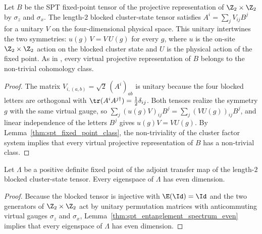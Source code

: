 \begin{lemma}
    \label{thm:cluster_spt_fixed_point}
    \leanok
    Let $B$ be the SPT fixed-point tensor of the projective representation of
    $\Z_2\times\Z_2$ by $\sigma_z$ and $\sigma_x$.  The length-$2$ blocked
    cluster-state tensor satisfies $A^i=\sum_jV_{ij}B^j$ for a unitary $V$ on the
    four-dimensional physical space.  This unitary intertwines the two symmetries:
    $u(g)\,V=V\,U(g)$ for every $g$, where $u$ is the on-site
    $\Z_2\times\Z_2$ action on the blocked cluster state and $U$ is the physical
    action of the fixed point. As in \cite[Section~III.A]{Cirac2021Matrix},
    every virtual projective representation of $B$ belongs to the non-trivial
    cohomology class.
\end{lemma}
\begin{proof}
    \leanok
    The matrix $V_{i,(a,b)}=\sqrt2\,(A^i)_{ab}$ is unitary because the four
    blocked letters are orthogonal with $\tr(A^iA^{j\dagger})=\tfrac12\delta_{ij}$.
    Both tensors realize the symmetry $g$ with the same virtual gauge, so
    $\sum_j(u(g)V)_{ij}B^j=\sum_j(VU(g))_{ij}B^j$, and linear independence of
    the letters $B^j$ gives $u(g)V=VU(g)$. By
    Lemma~\ref{thm:spt_fixed_point_class}, the non-triviality of the cluster
    factor system implies that every virtual projective representation of $B$
    has a non-trivial class.
\end{proof}

\begin{lemma}
    \label{thm:cluster_entanglement_spectrum_even}
    \leanok
    Let $\Lambda$ be a positive definite fixed point of the adjoint transfer map
    of the length-$2$ blocked cluster-state tensor.  Every eigenspace of
    $\Lambda$ has even dimension.
\end{lemma}
\begin{proof}
    \leanok
    Because the blocked tensor is injective with $\E(\Id)=\Id$ and the two
    generators of $\Z_2\times\Z_2$ act by unitary permutation matrices with
    anticommuting virtual gauges $\sigma_z$ and $\sigma_x$,
    Lemma~\ref{thm:spt_entanglement_spectrum_even} implies that every
    eigenspace of $\Lambda$ has even dimension.
\end{proof}

